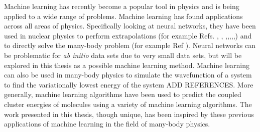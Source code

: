 Machine learning has recently become a popular tool in physics and is being applied to a wide range of problems. Machine learning has found applications across all areas of physics. Specifically looking at neural networks, they have been used in nuclear physics to perform extrapolations (for example Refs. \cite{Ref24}, \cite{Ref25}, \cite{Ref26},\cite{Ref27},\cite{Ref28},\cite{Ref29},\cite{Ref30},\cite{Ref31}) and to directly solve the many-body problem (for example Ref \cite{Ref32}).  Neural networks can be problematic for \textit{ab initio} data sets due to very small data sets, but will be explored in this thesis as a possible machine learning method.  Machine learning can also be used in many-body physics to simulate the wavefunction of a system to find the variationally lowest energy of the system {ADD REFERENCES}.  More generally, machine learning algorithms have been used to predict the coupled cluster energies of molecules using a variety of machine learning algorithms.  The work presented in this thesis, though unique, has been inspired by these previous applications of machine learning in the field of many-body physics. 